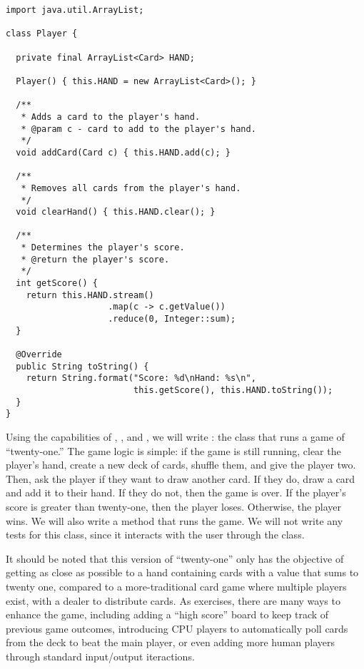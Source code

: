 \begin{lstlisting}[language=MyJava]
import java.util.ArrayList;

class Player {

  private final ArrayList<Card> HAND;

  Player() { this.HAND = new ArrayList<Card>(); }

  /**
   * Adds a card to the player's hand.
   * @param c - card to add to the player's hand.
   */
  void addCard(Card c) { this.HAND.add(c); }

  /**
   * Removes all cards from the player's hand.
   */
  void clearHand() { this.HAND.clear(); }

  /**
   * Determines the player's score.
   * @return the player's score.
   */
  int getScore() {
    return this.HAND.stream()
                    .map(c -> c.getValue())
                    .reduce(0, Integer::sum);
  }

  @Override
  public String toString() {
    return String.format("Score: %d\nHand: %s\n", 
                         this.getScore(), this.HAND.toString());
  }
}
\end{lstlisting}

Using the capabilities of , , and , we will write : the class that runs a game of ``twenty-one.'' The game logic is simple: if the game is still running, clear the player's hand, create a new deck of cards, shuffle them, and give the player two. Then, ask the player if they want to draw another card. If they do, draw a card and add it to their hand. If they do not, then the game is over. If the player's score is greater than twenty-one, then the player loses. Otherwise, the player wins. We will also write a  method that runs the game. We will not write any tests for this class, since it interacts with the user through the  class.

It should be noted that this version of ``twenty-one'' only has the objective of getting as close as possible to a hand containing cards with a value that sums to twenty one, compared to a more-traditional card game where multiple players exist, with a dealer to distribute cards. As exercises, there are many ways to enhance the game, including adding a ``high score'' board to keep track of previous game outcomes, introducing CPU players to automatically poll cards from the deck to beat the main player, or even adding more human players through standard input/output iteractions. 

